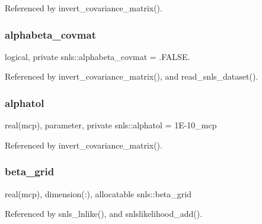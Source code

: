 Referenced by invert\+\_\+covariance\+\_\+matrix().

\mbox{\label{namespacesnls_ab8a52f43b875f3858fb98da0194a2cb8}} 
\subsubsection{\texorpdfstring{alphabeta\+\_\+covmat}{alphabeta\_covmat}}
{\footnotesize\ttfamily logical, private snls\+::alphabeta\+\_\+covmat = .F\+A\+L\+S\+E.\hspace{0.3cm}{\ttfamily [private]}}



Referenced by invert\+\_\+covariance\+\_\+matrix(), and read\+\_\+snls\+\_\+dataset().

\mbox{\label{namespacesnls_a0788c80251a81d3072f95cb12143388d}} 
\subsubsection{\texorpdfstring{alphatol}{alphatol}}
{\footnotesize\ttfamily real(mcp), parameter, private snls\+::alphatol = 1\+E-\/10\+\_\+mcp\hspace{0.3cm}{\ttfamily [private]}}



Referenced by invert\+\_\+covariance\+\_\+matrix().

\mbox{\label{namespacesnls_a56411cdf57a0e9358f977a9dc70b1715}} 
\subsubsection{\texorpdfstring{beta\+\_\+grid}{beta\_grid}}
{\footnotesize\ttfamily real(mcp), dimension(\+:), allocatable snls\+::beta\+\_\+grid\hspace{0.3cm}{\ttfamily [private]}}



Referenced by snls\+\_\+lnlike(), and snlslikelihood\+\_\+add().

\mbox{\label{namespacesnls_ad81e06277b2382bce10042fab9dcea40}} 
